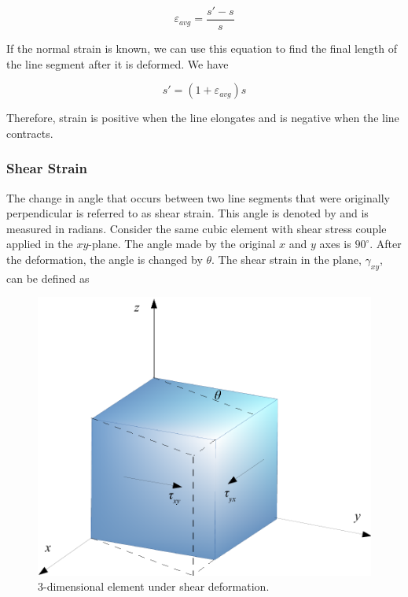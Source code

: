 \documentclass[
10pt,
a4paper,
openany,
svgnames,
]{book}
\begin{document}
\begin{equation}
  \varepsilon _{avg} = \frac{s' - s}{s}
\end{equation}

If the normal strain is known, we can use this equation to find the final length of the line segment after it is deformed. We have

\begin{equation}
  s' = (1 + \varepsilon_{avg})s
\end{equation}

Therefore, strain is positive when the line elongates and is negative when the line contracts.

\subsubsection{Shear Strain}

The change in angle that occurs between two line segments that were originally perpendicular is referred to as shear strain. This angle is denoted by and is measured in radians. Consider the same cubic element with shear stress couple applied in the $xy$-plane. The angle made by the original $x$ and $y$ axes is $90^{\circ}$. After the deformation, the angle is changed by $\theta$. The shear strain in the plane, $\gamma_{xy}$, can be defined as 

\begin{figure}
  \centering
  \includegraphics[scale=0.6]{pictures/Static-body-load-analysis/3d-shear-deformation}
  \caption{3-dimensional element under shear deformation.}
  \label{fig: 3d shear deformation}
\end{figure}
\end{document}
